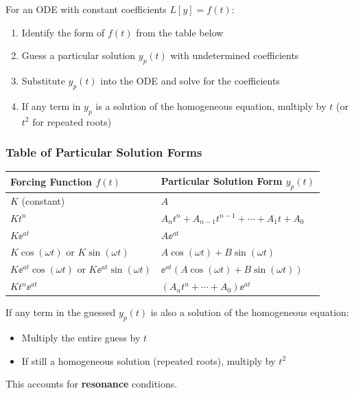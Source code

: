 \begin{definitionbox}[title=Definition: Method of Undetermined Coefficients]
For an ODE with constant coefficients $L[y] = f(t)$:
\begin{enumerate}
    \item Identify the form of $f(t)$ from the table below
    \item Guess a particular solution $y_p(t)$ with undetermined coefficients
    \item Substitute $y_p(t)$ into the ODE and solve for the coefficients
    \item If any term in $y_p$ is a solution of the homogeneous equation, multiply by $t$ (or $t^2$ for repeated roots)
\end{enumerate}
\end{definitionbox}

\subsubsection{Table of Particular Solution Forms}

\begin{center}
\begin{tabular}{ll}
\toprule
\textbf{Forcing Function $f(t)$} & \textbf{Particular Solution Form $y_p(t)$} \\
\midrule
$K$ (constant) & $A$ \\
$Kt^n$ & $A_n t^n + A_{n-1}t^{n-1} + \cdots + A_1 t + A_0$ \\
$K\ee^{at}$ & $A\ee^{at}$ \\
$K\cos(\omega t)$ or $K\sin(\omega t)$ & $A\cos(\omega t) + B\sin(\omega t)$ \\
$K\ee^{at}\cos(\omega t)$ or $K\ee^{at}\sin(\omega t)$ & $\ee^{at}(A\cos(\omega t) + B\sin(\omega t))$ \\
$Kt^n\ee^{at}$ & $(A_n t^n + \cdots + A_0)\ee^{at}$ \\
\bottomrule
\end{tabular}
\end{center}

\begin{warningbox}[title=Modification Rule for Resonance]
If any term in the guessed $y_p(t)$ is also a solution of the homogeneous equation:
\begin{itemize}
    \item Multiply the entire guess by $t$
    \item If still a homogeneous solution (repeated roots), multiply by $t^2$
\end{itemize}
This accounts for \textbf{resonance} conditions.
\end{warningbox}

